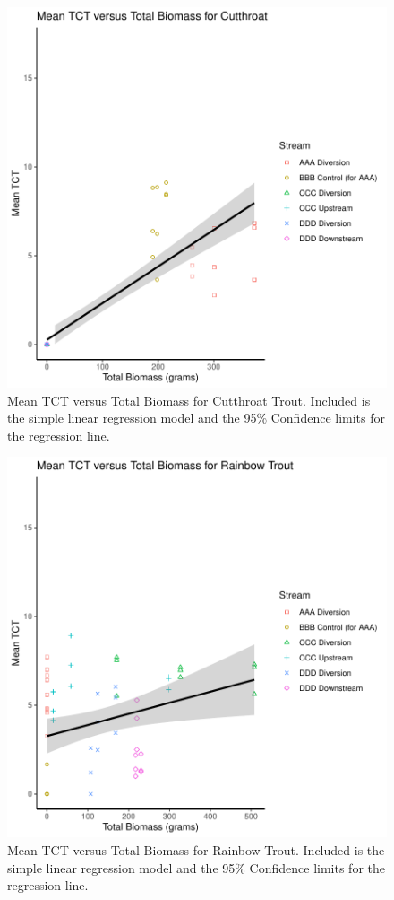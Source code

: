 \begin{figure}[H]
\includegraphics{AppendixImages/model_CT.pdf}
\caption{    Mean TCT versus Total Biomass for Cutthroat Trout. Included is the simple linear regression model and the 95\% Confidence limits for the regression line.}
\label{fig:ctanalysis}
\end{figure}



\begin{figure}[H]
\includegraphics{AppendixImages/model_RB.pdf}
\caption{   Mean TCT versus Total Biomass for Rainbow Trout. Included is the simple linear regression model and the 95\% Confidence limits for the regression line.}
\label{fig:rbanalysis}
\end{figure}






